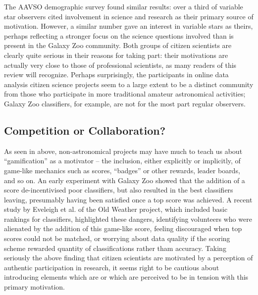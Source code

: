 \documentclass{ar2e}
\begin{document}
The AAVSO demographic survey \citep{P+P2012} found similar results: over a third
of variable star observers cited involvement in science and research as their
primary source of motivation. However, a similar number gave an interest in
variable stars as theirs, perhaps reflecting a stronger focus on the science
questions involved than is present in the Galaxy Zoo community. Both groups of
citizen scientists are clearly quite serious in their reasons for taking part:
their motivations are actually very close to those of professional scientists,
as many readers of this review will recognize. Perhaps surprisingly, the
participants in online data analysis citizen science projects seem to a large
extent to be a distinct community from those who participate in more traditional
amateur astronomical activities; Galaxy Zoo classifiers, for example, are not
for the most part regular observers. 





\subsection{Competition or Collaboration?}
\label{sec:crowd:gamification}


As seen in  above, non-astronomical projects may have
much to teach us about ``gamification'' as a motivator -- the inclusion, either
explicitly or implicitly, of game-like mechanics such as scores, ``badges'' or
other rewards, leader boards, and so on. An early experiment with Galaxy Zoo
showed that the addition of a score de-incentivised poor classifiers, but also
resulted in the best classifiers leaving, presumably having been satisfied once
a top score was achieved. A recent study by Eveleigh et al. of the Old Weather
project, which included basic rankings for classifiers, highlighted these
dangers, identifying volunteers who were alienated by the addition of this
game-like score, feeling discouraged when top scores could not be matched, or
worrying about data quality if the scoring scheme rewarded quantity of
classifications rather tham accuracy. Taking seriously the above finding 
that citizen scientists are motivated by a perception of authentic
participation in research, it seems right to be cautious about introducing
elements which are or which are perceived to be in tension with this primary
motivation. 
\end{document}
